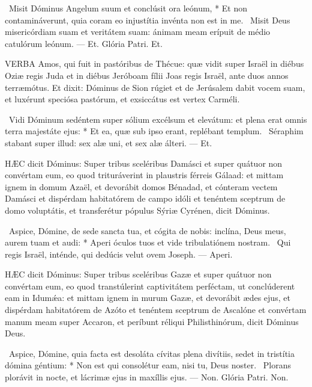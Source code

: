 \R\ Misit Dóminus Angelum suum et conclúsit ora leónum, * Et non contamináverunt, quia coram eo injustítia invénta non est in me. \V\ Misit Deus misericórdiam suam et veritátem suam: ánimam meam erípuit de médio catulórum leónum. — Et. Glória Patri. Et.




\lettrine[lines=2]{V}{ERBA} Amos, qui fuit in pastóribus de Thécue: quæ vidit super Israël in diébus Oziæ regis Juda et in diébus Jeróboam fílii Joas regis Israël, ante duos annos terræmótus. Et dixit: Dóminus de Sion rúgiet et de Jerúsalem dabit vocem suam, et luxérunt speciósa pastórum, et exsiccátus est vertex Carméli.

\R\ Vidi Dóminum sedéntem super sólium excélsum et elevátum: et plena erat omnis terra majestáte ejus: * Et ea, quæ sub ipso erant, replébant templum. \V\ Séraphim stabant super illud: sex alæ uni, et sex alæ álteri. — Et.


\lettrine[lines=2]{H}{ÆC} dicit Dóminus: Super tribus sceléribus Damásci et super quátuor non convértam eum, eo quod trituráverint in plaustris férreis Gálaad: et mittam ignem in domum Azaël, et devorábit domos Bénadad, et cónteram vectem Damásci et dispérdam habitatórem de campo idóli et tenéntem sceptrum de domo voluptátis, et transferétur pópulus Sýriæ Cyrénen, dicit Dóminus.

\R\ Aspice, Dómine, de sede sancta tua, et cógita de nobis: inclína, Deus meus, aurem tuam et audi: * Aperi óculos tuos et vide tribulatiónem nostram. \V\ Qui regis Israël, inténde, qui dedúcis velut ovem Joseph. — Aperi.



\lettrine[lines=2]{H}{ÆC} dicit Dóminus: Super tribus sceléribus Gazæ et super quátuor non convértam eum, eo quod transtúlerint captivitátem perféctam, ut conclúderent eam in Idumǽa: et mittam ignem in murum Gazæ, et devorábit ædes ejus, et dispérdam habitatórem de Azóto et tenéntem sceptrum de Ascalóne et convértam manum meam super Accaron, et períbunt réliqui Philisthinórum, dicit Dóminus Deus.

\R\ Aspice, Dómine, quia facta est desoláta cívitas plena divítiis, sedet in tristítia dómina géntium: * Non est qui consolétur eam, nisi tu, Deus noster. \V\ Plorans plorávit in nocte, et lácrimæ ejus in maxíllis ejus. — Non. Glória Patri. Non.

